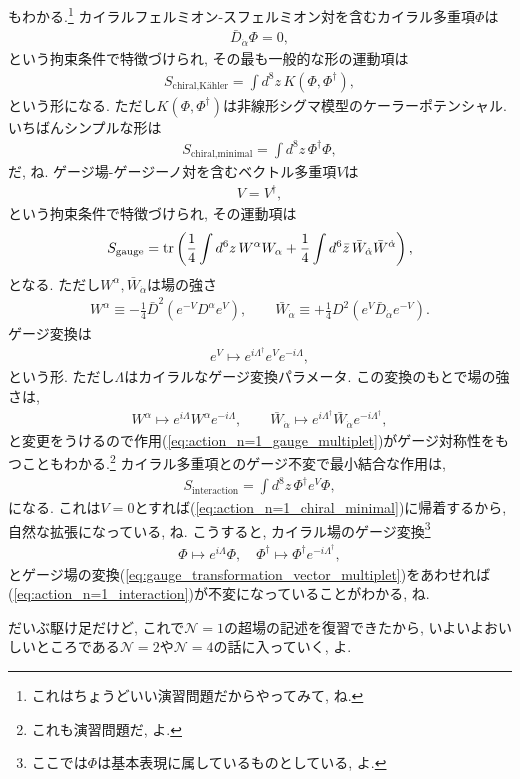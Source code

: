 \documentclass{ltjsarticle}
\theoremstyle{definition}
\begin{document}
もわかる.\footnote{これはちょうどいい演習問題だからやってみて, ね.} カイラルフェルミオン-スフェルミオン対を含むカイラル多重項$\Phi$は
\begin{gather}
  \bar D_{\dot\alpha}\Phi=0,
\end{gather}
という拘束条件で特徴づけられ, その最も一般的な形の運動項は
\begin{align}
  S_{\text{chiral,K\"ahler}}=\int d^8z\,K(\Phi,\Phi^\dagger)\label{eq:scalar_N=1_kaehler},
\end{align}
という形になる. ただし$K(\Phi,\Phi^\dagger)$は非線形シグマ模型のケーラーポテンシャル. いちばんシンプルな形は
\begin{align}
  S_{\text{chiral,minimal}}=\int d^8z\,\Phi^\dagger\Phi,\label{eq:action_n=1_chiral_minimal}
\end{align}
だ, ね. ゲージ場-ゲージーノ対を含むベクトル多重項$V$は
\begin{gather}
  V=V^\dagger,
\end{gather}
という拘束条件で特徴づけられ, その運動項は
\begin{gather}
  S_{\text{gauge}}=\tr\left(\frac14\int d^6z\,W^\alpha W_\alpha+\frac14\int d^6\bar z\,\bar W_{\dot\alpha}\bar W^{\dot\alpha}\right),\label{eq:action_n=1_gauge_multiplet}
\end{gather}
となる. ただし$W^\alpha,\bar W_{\dot\alpha}$は場の強さ
\begin{gather}
  W^\alpha\equiv-\frac14\bar D^2\left(e^{-V}D^\alpha e^V\right),\qquad\bar W_{\dot\alpha}\equiv+\frac14D^2\left(e^V\bar D_{\dot\alpha}e^{-V}\right).
\end{gather}
ゲージ変換は
\begin{gather}
  e^V\mapsto e^{i\Lambda^\dagger}e^Ve^{-i\Lambda},\label{eq:gauge_transformation_vector_multiplet}
\end{gather}
という形. ただし$\Lambda$はカイラルなゲージ変換パラメータ. この変換のもとで場の強さは,
\begin{gather}
  W^\alpha\mapsto e^{i\Lambda}W^\alpha e^{-i\Lambda},\qquad \bar W_{\dot\alpha}\mapsto e^{i\Lambda^\dagger}\bar W_{\dot\alpha}e^{-i\Lambda^\dagger},
\end{gather}
と変更をうけるので作用(\ref{eq:action_n=1_gauge_multiplet})がゲージ対称性をもつこともわかる.\footnote{これも演習問題だ, よ.} カイラル多重項とのゲージ不変で最小結合な作用は,
\begin{gather}
  S_{\text{interaction}}=\int d^8z\,\Phi^\dagger e^V\Phi,\label{eq:action_n=1_interaction}
\end{gather}
になる. これは$V=0$とすれば(\ref{eq:action_n=1_chiral_minimal})に帰着するから, 自然な拡張になっている, ね. こうすると, カイラル場のゲージ変換\footnote{ここでは$\Phi$は基本表現に属しているものとしている, よ.}
\begin{gather}
  \Phi\mapsto e^{i\Lambda}\Phi,\quad\Phi^\dagger\mapsto\Phi^\dagger e^{-i\Lambda^\dagger},
\end{gather}
とゲージ場の変換(\ref{eq:gauge_transformation_vector_multiplet})をあわせれば(\ref{eq:action_n=1_interaction})が不変になっていることがわかる, ね.\par
だいぶ駆け足だけど, これで$\mathcal N=1$の超場の記述を復習できたから, いよいよおいしいところである$\mathcal N=2$や$\mathcal N=4$の話に入っていく, よ.
\end{document}
